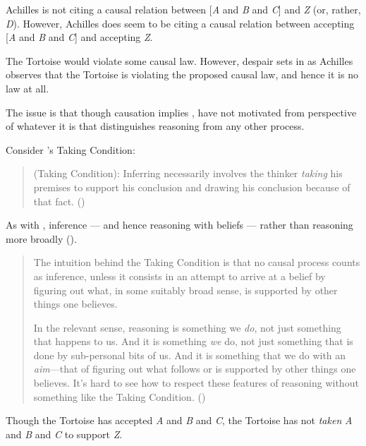 \begin{note}
  Achilles is not citing a causal relation between [\emph{A} and \emph{B} and \emph{C}] and \emph{Z} (or, rather, \emph{D}).
  However, Achilles does seem to be citing a causal relation between accepting [\emph{A} and \emph{B} and \emph{C}] and accepting \emph{Z}.

  The Tortoise would violate some causal law.
  However, despair sets in as Achilles observes that the Tortoise is violating the proposed causal law, and hence it is no law at all.

  The issue is that though causation implies \ESU{}, have not motivated \ESU{} from perspective of whatever it is that distinguishes reasoning from any other process.
\end{note}

\begin{note}
  Consider \citeauthor{Boghossian:2014aa}'s Taking Condition:
  \begin{quote}
    (Taking Condition): Inferring necessarily involves the thinker \emph{taking} his premises to support his conclusion and drawing his conclusion because of that fact.\nolinebreak
    \mbox{}\hfill\mbox{(\citeyear[5]{Boghossian:2014aa})}
  \end{quote}
  As with \citeauthor{Armstrong:1968vh}, inference --- and hence reasoning with beliefs --- rather than reasoning more broadly (\citeyear[cf][2]{Boghossian:2014aa}).
  

  \begin{quote}
    The intuition behind the Taking Condition is that no causal process counts as inference, unless it consists in an attempt to arrive at a belief by figuring out what, in some suitably broad sense, is supported by other things one believes.

    In the relevant sense, reasoning is something we \emph{do}, not just something that happens to us.
    And it is something \emph{we} do, not just something that is done by sub-personal bits of us.
    And it is something that we do with an \emph{aim}---that of figuring out what follows or is supported by other things one believes.
    It’s hard to see how to respect these features of reasoning without something like the Taking Condition.\nolinebreak
    \mbox{}\hfill\mbox{(\citeyear[5]{Boghossian:2014aa})}
  \end{quote}

  Though the Tortoise has accepted \emph{A} and \emph{B} and \emph{C}, the Tortoise has not \emph{taken} \emph{A} and \emph{B} and \emph{C} to support \emph{Z}.


\end{note}
